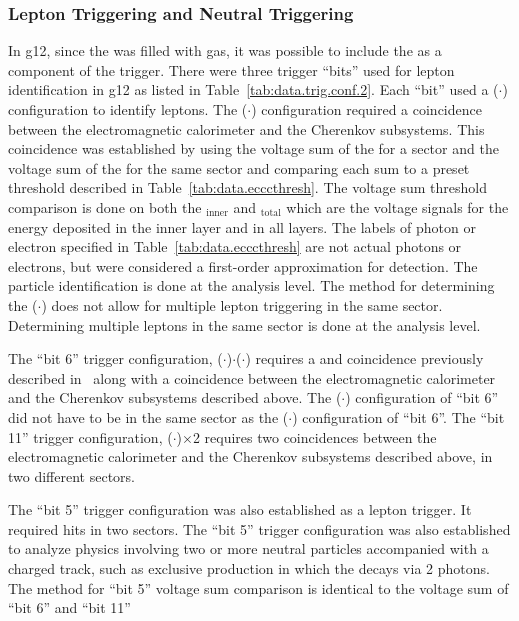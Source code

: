 \subsubsection{Lepton Triggering and Neutral Triggering}\label{sec.data.trig.lepton}
In g12, since the  was filled with gas, it was possible to include the  as a component of the trigger. 
There were three trigger ``bits'' used for lepton identification in g12 as listed in Table~\ref{tab:data.trig.conf.2}. Each ``bit'' used a ($\cdot$) configuration to identify leptons. The ($\cdot$) configuration required a coincidence between the electromagnetic calorimeter and the Cherenkov subsystems. This coincidence was established by using the voltage sum of the  for a sector and the voltage sum of the  for the same sector and comparing each sum to a preset threshold described in Table~\ref{tab:data.ecccthresh}. The  voltage sum threshold comparison is done on both the $_\mathrm{inner}$ and $_{\mathrm{total}}$ which are the  voltage signals for the energy deposited in the inner layer and in all layers. The labels of photon or electron specified in Table~\ref{tab:data.ecccthresh} are not actual photons or electrons, but were considered a first-order approximation for detection. The particle identification is done at the analysis level. The method for determining the ($\cdot$) does not allow for multiple lepton triggering in the same sector. Determining multiple leptons in the same sector is done at the analysis level. 

The ``bit 6'' trigger configuration, ($\cdot$)$\cdot$($\cdot$) requires a  and  coincidence previously described in~\cite{g12note} along with a coincidence between the electromagnetic calorimeter and the Cherenkov subsystems described above. The ($\cdot$) configuration of ``bit 6'' did not have to be in the same sector as the ($\cdot$) configuration of ``bit 6''. The ``bit 11'' trigger configuration, ($\cdot$)$\times$2 requires two coincidences between the electromagnetic calorimeter and the Cherenkov subsystems described above, in two different sectors. 

The ``bit 5'' trigger configuration was also established as a lepton trigger. It required  hits in two sectors. The ``bit 5'' trigger configuration was also established to analyze physics involving two or more neutral particles accompanied with a charged track, such as exclusive \pizT production in which the \pizT decays via 2 photons. The method for ``bit 5'' voltage sum comparison is identical to the  voltage sum of ``bit 6'' and ``bit 11''

